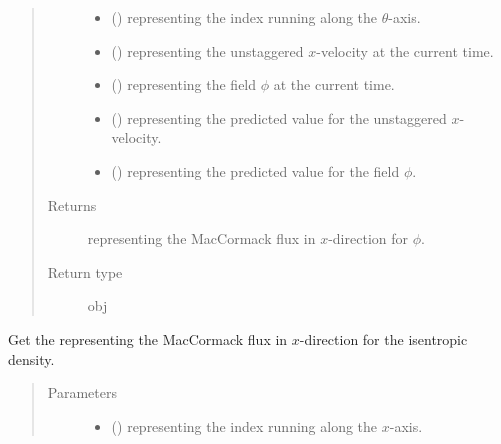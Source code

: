 \documentclass[letterpaper,10pt,english]{sphinxmanual}
\begin{document}
\begin{fulllineitems}
\begin{fulllineitems}
\begin{quote}
\begin{description}
\begin{itemize}
\item {} 
 () \textendash{}  representing the index running along the \(\theta\)-axis.

\item {} 
 () \textendash{}  representing the unstaggered \(x\)-velocity at the current time.

\item {} 
 () \textendash{}  representing the field \(\phi\) at the current time.

\item {} 
 () \textendash{}  representing the predicted value for the unstaggered \(x\)-velocity.

\item {} 
 () \textendash{}  representing the predicted value for the field \(\phi\).

\end{itemize}

\item[{Returns}] \leavevmode
{} representing the MacCormack flux in \(x\)-direction for \(\phi\).

\item[{Return type}] \leavevmode
obj

\end{description}\end{quote}

\end{fulllineitems}


\begin{fulllineitems}
\label{\detokenize{api:tasmania.dycore.flux_isentropic_maccormack.FluxIsentropicMacCormack._get_maccormack_flux_x_s}}
Get the  representing the MacCormack flux in \(x\)-direction
for the isentropic density.
\begin{quote}\begin{description}
\item[{Parameters}] \leavevmode\begin{itemize}
\item {} 
 () \textendash{}  representing the index running along the \(x\)-axis.


\end{itemize}
\end{description}
\end{quote}
\end{fulllineitems}
\end{fulllineitems}
\end{document}
